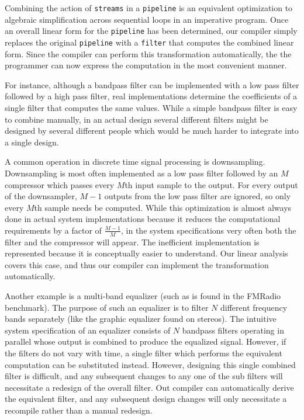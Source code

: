 Combining the action of {\tt streams} in a {\tt pipeline} is an
equivalent optimization to algebraic simplification across sequential
loops in an imperative program.  Once an overall linear form for the
{\tt pipeline} has been determined, our compiler simply replaces the
original {\tt pipeline} with a {\tt filter} that computes the combined
linear form. Since the compiler can perform this transformation
automatically, the the programmer can now express the computation in
the most convenient manner.

For instance, although a bandpass filter can be implemented with a low
pass filter followed by a high pass filter, real implementations
determine the coefficients of a single filter that computes the same
values. While a simple bandpass filter is easy to combine manually, in
an actual design several different filters might be designed by
several different people which would be much harder to integrate into
a single design.

A common operation in discrete time signal processing is downsampling.
Downsampling is most often implemented as a low pass filter followed
by an $M$ compressor which passes every $M$th input sample to the
output.  For every output of the downsampler, $M-1$ outputs from the
low pass filter are ignored, so only every $M$th sample needs be
computed.  While this optimization is almost always done in actual
system implementations because it reduces the computational
requirements by a factor of $\frac{M-1}{M}$, in the system
specifications very often both the filter and the compressor will
appear. The inefficient implementation is represented because it is
conceptually easier to understand.  Our linear analysis covers this
case, and thus our compiler can implement the transformation
automatically.

Another example is a multi-band equalizer (such as is found in the
FMRadio benchmark).  The purpose of such an equalizer is to filter $N$
different frequency bands separately (like the graphic equalizer found
on stereos). The intuitive system specification of an equalizer
consists of $N$ bandpass filters operating in parallel whose output is
combined to produce the equalized signal. However, if the filters do
not vary with time, a single filter which performs the equivalent
computation can be substituted instead.  However, designing this
single combined filter is difficult, and any subsequent changes to any
one of the sub filters will necessitate a redesign of the overall
filter.  Out compiler can automatically derive the equivalent filter,
and any subsequent design changes will only necessitate a recompile
rather than a manual redesign.



